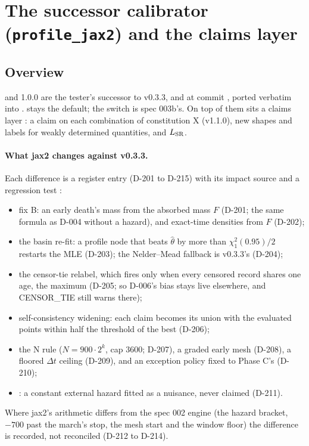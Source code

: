 \section{The successor calibrator (\texttt{profile\_jax2}) and the claims layer}\label{sec:pj}

\subsection{Overview}\label{sec:pj-overview}

 and  1.0.0 are the tester's successor to v0.3.3, 
and  at  commit , ported verbatim into
 .  stays the default; the switch is spec 003b's.
On top of them sits a claims layer : a claim on each combination of constitution X (v1.1.0), new
shapes and labels for weakly determined quantities, and $L_{\rm SR}$.

\paragraph{What jax2 changes against v0.3.3.} Each difference is a register entry (D-201 to D-215) with its impact
source and a regression test :
\begin{itemize}[nosep]
  \item fix B: an early death's mass from the absorbed mass $F$ (D-201; the same formula as D-004 without a
    hazard), and exact-time densities from $F$ (D-202);
  \item the basin re-fit: a profile node that beats $\hat\theta$ by more than $\chi^2_1(0.95)/2$ restarts the MLE
    (D-203); the Nelder--Mead fallback is v0.3.3's (D-204);
  \item the censor-tie relabel, which fires only when every censored record shares one age, the maximum (D-205; so
    D-006's bias stays live elsewhere, and CENSOR\_TIE still warns there);
  \item self-consistency widening: each claim becomes its union with the evaluated points within half the threshold
    of the best (D-206);
  \item the N rule ($N=900\cdot2^k$, cap 3600; D-207), a graded early mesh (D-208), a floored $\Delta t$ ceiling
    (D-209), and an exception policy fixed to Phase C's  (D-210);
  \item {}: a constant external hazard fitted as a nuisance, never claimed (D-211).
\end{itemize}
Where jax2's arithmetic differs from the spec 002 engine (the hazard bracket, $-700$ past the march's stop, the mesh
start and the window floor) the difference is recorded, not reconciled (D-212 to D-214).

